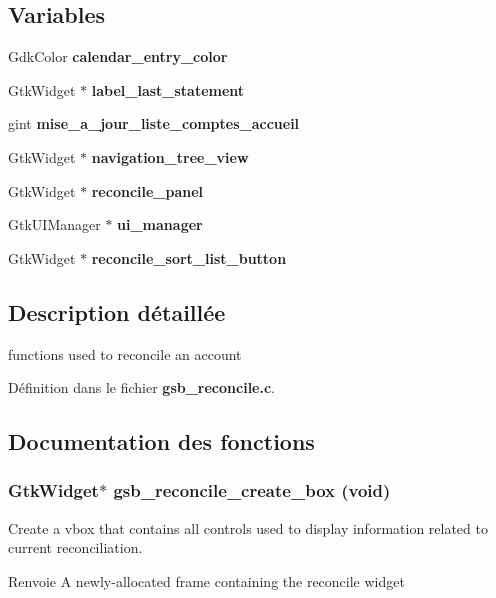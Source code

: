 \subsection*{Variables}
\begin{DoxyCompactItemize}
\item 
GdkColor {\bf calendar\_\-entry\_\-color}
\item 
GtkWidget $\ast$ {\bf label\_\-last\_\-statement}
\item 
gint {\bf mise\_\-a\_\-jour\_\-liste\_\-comptes\_\-accueil}
\item 
GtkWidget $\ast$ {\bf navigation\_\-tree\_\-view}
\item 
GtkWidget $\ast$ {\bf reconcile\_\-panel}
\item 
GtkUIManager $\ast$ {\bf ui\_\-manager}
\item 
GtkWidget $\ast$ {\bf reconcile\_\-sort\_\-list\_\-button}
\end{DoxyCompactItemize}


\subsection{Description détaillée}
functions used to reconcile an account 

Définition dans le fichier {\bf gsb\_\-reconcile.c}.



\subsection{Documentation des fonctions}
\subsubsection[{gsb\_\-reconcile\_\-create\_\-box}]{\setlength{\rightskip}{0pt plus 5cm}GtkWidget$\ast$ gsb\_\-reconcile\_\-create\_\-box (void)}\label{gsb__reconcile_8c_a0a935736f287cf69e6339d44fd1e2260}
Create a vbox that contains all controls used to display information related to current reconciliation.

\begin{DoxyReturn}{Renvoie}
A newly-\/allocated frame containing the reconcile widget 
\end{DoxyReturn}


